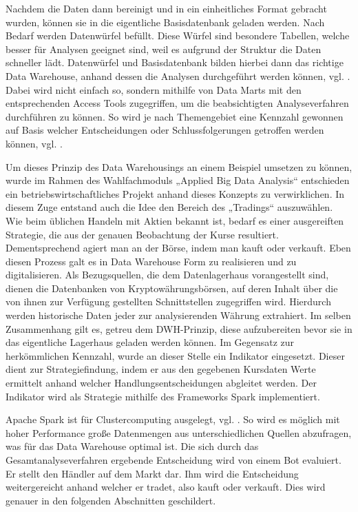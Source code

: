 Nachdem die Daten dann bereinigt und in ein einheitliches Format gebracht wurden, können sie in die eigentliche Basisdatenbank geladen werden. Nach Bedarf werden Datenwürfel befüllt. Diese Würfel sind besondere Tabellen, welche besser für Analysen geeignet sind, weil es aufgrund der Struktur die Daten schneller lädt. Datenwürfel und Basisdatenbank bilden hierbei dann das richtige Data Warehouse, anhand dessen die Analysen durchgeführt werden können, vgl. \cite{vorlesung}. Dabei wird nicht einfach so, sondern mithilfe von Data Marts mit den entsprechenden Access Tools zugegriffen, um die beabsichtigten Analyseverfahren durchführen zu können. So wird je nach Themengebiet eine Kennzahl gewonnen auf Basis welcher Entscheidungen oder Schlussfolgerungen getroffen werden können, vgl. \cite{dtw}.

Um dieses Prinzip des Data Warehousings an einem Beispiel umsetzen zu können, wurde im Rahmen des Wahlfachmoduls „Applied Big Data Analysis“ entschieden ein betriebswirtschaftliches Projekt anhand dieses Konzepts zu verwirklichen. In diesem Zuge entstand auch die Idee den Bereich des „Tradings“ auszuwählen. Wie beim üblichen Handeln mit Aktien bekannt ist, bedarf es einer ausgereiften Strategie, die aus der genauen Beobachtung der Kurse resultiert. Dementsprechend agiert man an der Börse, indem man kauft oder verkauft. Eben diesen Prozess galt es in Data Warehouse Form zu realisieren und zu digitalisieren. Als Bezugsquellen, die dem Datenlagerhaus vorangestellt sind, dienen die Datenbanken von Kryptowährungsbörsen, auf deren Inhalt über die von ihnen zur Verfügung gestellten Schnittstellen zugegriffen wird. Hierdurch werden historische Daten jeder zur analysierenden Währung extrahiert. Im selben Zusammenhang gilt es, getreu dem DWH-Prinzip, diese aufzubereiten bevor sie in das eigentliche Lagerhaus geladen werden können. Im Gegensatz zur herkömmlichen Kennzahl, wurde an dieser Stelle ein Indikator eingesetzt. Dieser dient zur Strategiefindung, indem er aus den gegebenen Kursdaten Werte ermittelt anhand welcher Handlungsentscheidungen abgleitet werden. Der Indikator wird als Strategie mithilfe des Frameworks Spark implementiert. 

Apache Spark ist für Clustercomputing ausgelegt, vgl. \cite{spark}. So wird es möglich mit hoher Performance große Datenmengen aus unterschiedlichen Quellen abzufragen, was für das Data Warehouse optimal ist. Die sich durch das Gesamtanalyseverfahren ergebende Entscheidung wird von einem Bot evaluiert. Er stellt den Händler auf dem Markt dar. Ihm wird die Entscheidung weitergereicht anhand welcher er tradet, also kauft oder verkauft. Dies wird genauer in den folgenden Abschnitten geschildert.
